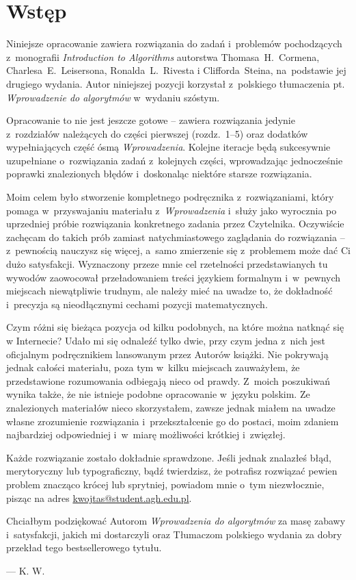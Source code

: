 \chapter{Wstęp}

\noindent Niniejsze opracowanie zawiera rozwiązania do zadań i~problemów pochodzących z~monografii \textsl{Introduction to Algorithms} autorstwa Thomasa~H.~Cormena, Charlesa~E.~Leisersona, Ronalda~L.~Rivesta i Clifforda~Steina, na~podstawie jej drugiego wydania. Autor niniejszej pozycji korzystał z~polskiego tłumaczenia pt. \textsl{Wprowadzenie do algorytmów} w~wydaniu szóstym.

Opracowanie to nie jest jeszcze gotowe -- zawiera rozwiązania jedynie z~rozdziałów należących do części pierwszej (rozdz.~1\nobreakdash--5) oraz dodatków wypełniających część ósmą \textsl{Wprowadzenia}. Kolejne iteracje będą sukcesywnie uzupełniane o~rozwiązania zadań z~kolejnych części, wprowadzając jednocześnie poprawki znalezionych błędów i~doskonaląc niektóre starsze rozwiązania.

Moim celem było stworzenie kompletnego podręcznika z~rozwiązaniami, który pomaga w~przyswajaniu materiału z~\textsl{Wprowadzenia} i~służy jako wyrocznia po uprzedniej próbie rozwiązania konkretnego zadania przez Czytelnika. Oczywiście zachęcam do takich prób zamiast natychmiastowego zaglądania do rozwiązania -- z~pewnością nauczysz się więcej, a~samo zmierzenie się z~problemem może dać Ci dużo satysfakcji. Wyznaczony przeze mnie cel rzetelności przedstawianych tu wywodów zaowocował przeładowaniem treści językiem formalnym i~w~pewnych miejscach niewątpliwie trudnym, ale należy mieć na uwadze to, że dokładność i~precyzja są nieodłącznymi cechami pozycji matematycznych.

Czym różni się bieżąca pozycja od kilku podobnych, na które można natknąć się w Internecie? Udało mi się odnaleźć tylko dwie, przy czym jedna z~nich jest oficjalnym podręcznikiem lansowanym przez Autorów książki. Nie pokrywają jednak całości materiału, poza tym w~kilku miejscach zauważyłem, że przedstawione rozumowania odbiegają nieco od prawdy. Z~moich poszukiwań wynika także, że nie istnieje podobne opracowanie w~języku polskim. Ze znalezionych materiałów nieco skorzystałem, zawsze jednak miałem na uwadze własne zrozumienie rozwiązania i~przekształcenie go do postaci, moim zdaniem najbardziej odpowiedniej i~w~miarę możliwości krótkiej i~zwięzłej.

Każde rozwiązanie zostało dokładnie sprawdzone. Jeśli jednak znalazłeś błąd, merytoryczny lub typograficzny, bądź twierdzisz, że potrafisz rozwiązać pewien problem znacząco krócej lub sprytniej, powiadom mnie o~tym niezwłocznie, pisząc na adres \url{kwojtas@student.agh.edu.pl}.

Chciałbym podziękować Autorom \textsl{Wprowadzenia do algorytmów} za masę zabawy i~satysfakcji, jakich mi dostarczyli oraz Tłumaczom polskiego wydania za dobry przekład tego bestsellerowego tytułu.

\bigskip
{}\hfill--- K. W.

\endinput
